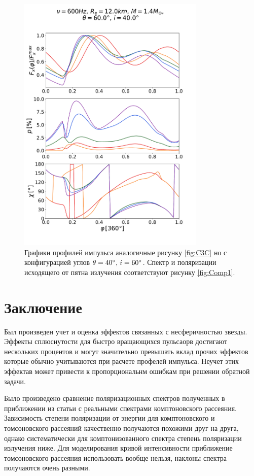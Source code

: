 \documentclass[14pt,a4paper]{extarticle}
\begin{document}
		\begin{figure}[H]
			\centering
			\includegraphics[width=0.8\textwidth]{CMComb11Ff.pdf}
			\caption{\small
				Графики профилей импульса аналогичные рисунку \ref{fig:C3C} но с конфигурацией углов $\theta=40\degree,\,i=60\degree$.
				Спектр и поляризации исходящего от пятна излучения соответствуют рисунку \ref{fig:Comp1}.
			}\label{fig:C2C}
		\end{figure}\newpage



	\newpage

	\section{Заключение}\label{conclusion}
		Был произведен учет и оценка эффектов связанных с несферичностью звезды.
		Эффекты сплюснутости для быстро вращающихся пульсаорв достигают нескольких процентов и могут значительно превышать вклад прочих эффектов которые обычно \cite{Poutanen2003,Viironen2004} учитываются при расчете профелей импульса. 
		Неучет этих эффектав может привести к пропорциональнм ошибкам при решении обратной задачи. 

		Было произведено сравнение поляризационных спектров полученных в приближении из статьи \cite{Viironen2004}  с реальными спектрами комптоновского рассеяния. 
		Зависимость степени поляризации от энергии для комптоновского и томсоновского рассеяний качественно получаются похожими друг на друга, однако систематически для комптонизованного спектра степень поляризации излучения ниже. 
		Для моделирования кривой интенсивности приближение томсоновского рассеяния использовать вообще нельзя, наклоны спектра получаются очень разными. 
\end{document}

